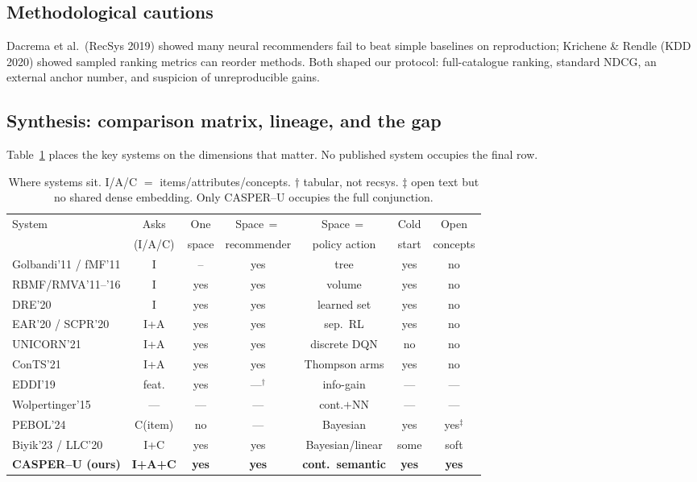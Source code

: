 \documentclass[11pt]{article}
\begin{document}
\subsection{Methodological cautions}
Dacrema et al.\ (RecSys 2019) showed many neural recommenders fail to beat simple baselines on reproduction;
Krichene \& Rendle (KDD 2020) showed sampled ranking metrics can reorder methods. Both shaped our protocol:
full-catalogue ranking, standard NDCG, an external anchor number, and suspicion of unreproducible gains.

\subsection{Synthesis: comparison matrix, lineage, and the gap}
Table~\ref{tab:matrix} places the key systems on the dimensions that matter. No published system occupies the
final row.

\begin{table}[h]\centering\small
\setlength{\tabcolsep}{4pt}
\begin{tabular}{lcccccc}
\toprule
System & Asks & One & Space\,$=$ & Space\,$=$ & Cold & Open\\
 & (I/A/C) & space & recommender & policy action & start & concepts\\
\midrule
Golbandi'11 / fMF'11      & I       & --  & yes & tree     & yes & no\\
RBMF/RMVA'11--'16         & I       & yes & yes & volume   & yes & no\\
DRE'20                    & I       & yes & yes & learned set & yes & no\\
EAR'20 / SCPR'20          & I+A     & yes & yes & sep.\ RL & yes & no\\
UNICORN'21                & I+A     & yes & yes & discrete DQN & no  & no\\
ConTS'21                  & I+A     & yes & yes & Thompson arms & yes & no\\
EDDI'19                   & feat.   & yes & ---$^\dagger$ & info-gain & ---  & ---\\
Wolpertinger'15           & ---     & ---  & ---  & cont.$+$NN & ---  & ---\\
PEBOL'24                  & C(item) & no  & ---  & Bayesian & yes & yes$^\ddagger$\\
Biyik'23 / LLC'20         & I+C     & yes & yes & Bayesian/linear & some & soft\\
\textbf{CASPER--U (ours)} & \textbf{I+A+C} & \textbf{yes} & \textbf{yes} & \textbf{cont.\ semantic} & \textbf{yes} & \textbf{yes}\\
\bottomrule
\end{tabular}
\caption{Where systems sit. I/A/C $=$ items/attributes/concepts. $\dagger$ tabular, not recsys. $\ddagger$ open
text but no shared dense embedding. Only CASPER--U occupies the full conjunction.}
\label{tab:matrix}
\end{table}
\end{document}
